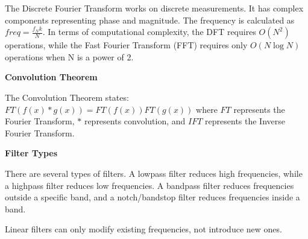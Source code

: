 \documentclass{article}
\begin{document}
\noindent The Discrete Fourier Transform works on discrete measurements. It has complex components representing phase and magnitude. The frequency is calculated as $freq = \frac{f_N k}{N}$. In terms of computational complexity, the DFT requires $O(N^2)$ operations, while the Fast Fourier Transform (FFT) requires only $O(N\log N)$ operations when N is a power of 2.

\noindent \textbf{Convolution Theorem}

\noindent The Convolution Theorem states:
$FT(f(x) * g(x)) = FT(f(x))FT(g(x))$
where $FT$ represents the Fourier Transform, $*$ represents convolution, and $IFT$ represents the Inverse Fourier Transform.

\noindent \textbf{Filter Types}

\noindent There are several types of filters. A lowpass filter reduces high frequencies, while a highpass filter reduces low frequencies. A bandpass filter reduces frequencies outside a specific band, and a notch/bandstop filter reduces frequencies inside a band.

\noindent Linear filters can only modify existing frequencies, not introduce new ones.
\end{document}
